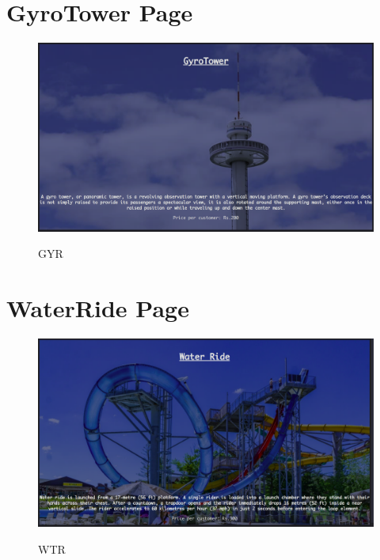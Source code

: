 \section{GyroTower Page}
\begin{figure}[H]
\centering
\caption{GYR}
\includegraphics[scale=.5]{./drp.png}
\\[0.2in]
\label{fig:ER diagram}
\end{figure}

\thispagestyle{fancy}


\section{WaterRide Page}
\begin{figure}[H]
\centering
\caption{WTR}
\includegraphics[scale=.5]{./wtr.png}
\\[0.2in]
\label{fig:ER diagram}
\end{figure}

\thispagestyle{fancy}



